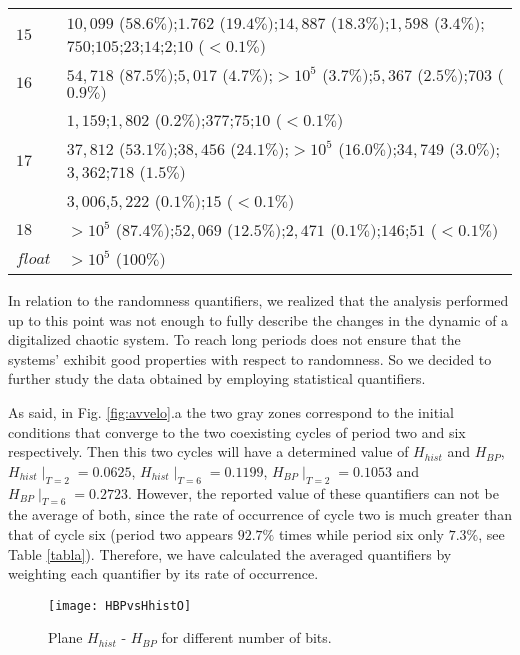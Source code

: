 \begin{table*}[!t]
\begin{tabular}{l  l  }
$15$ & $10,099$ {\scriptsize($58.6 \%)$};$1.762$ {\scriptsize($19.4 \%)$};$14,887$ {\scriptsize($18.3\%)$};$1,598$ {\scriptsize($3.4\%)$};$750$;$105$;$23$;$14$;$2$;$10$ {\scriptsize($<0.1\%)$}\\
$16$ & $54,718$ {\scriptsize($87.5\% )$};$5,017$ {\scriptsize($4.7\% )$};$>10^5$ {\scriptsize($3.7\% )$};$5,367$ {\scriptsize($2.5\% )$};$703$ {\scriptsize($0.9\% )$}\\
& $1,159$;$1,802$ {\scriptsize($0.2\% )$};$377$;$75$;$10$ {\scriptsize($<0.1\%  )$}\\  
$17$ & $37,812$ {\scriptsize($53.1\% )$};$38,456$ {\scriptsize($24.1\% )$};$>10^5$ {\scriptsize($16.0\%)$};$34,749$ {\scriptsize($3.0\% )$};$3,362$;$718$ {\scriptsize($1.5\%)$}\\
& $3,006$,$5,222$ {\scriptsize($0.1\% )$};$15$ {\scriptsize($<0.1 \%)$}\\  
$18$ & $>10^5$ {\scriptsize($87.4\%)$};$52,069$ {\scriptsize($12.5\% )$};$2,471$ {\scriptsize($0.1\% )$};$146$;$51$ {\scriptsize($<0.1 \%)$}\\
$float$ & $>10^5$ {\scriptsize($100\% )$}\\
\hline

\end{tabular}

\end{table*}


In relation to the randomness quantifiers, we realized that the analysis performed up to this point was not enough to fully describe the changes in the dynamic of a digitalized chaotic system.
To reach long periods does not ensure that the systems' exhibit good properties with respect to randomness. So we decided to further study the data obtained by employing statistical quantifiers.

As said, in Fig. \ref{fig:avvelo}.a the two gray zones correspond to the initial conditions that converge to the two coexisting cycles of period two and six respectively.
Then this two cycles will have a determined value of $H_{hist}$ and $H_{BP}$, $H_{hist}\mid_{T=2}=0.0625$, $H_{hist}\mid_{T=6}=0.1199$, $H_{BP}\mid_{T=2}=0.1053$ and $H_{BP}\mid_{T=6}=0.2723$.
However, the reported value of these quantifiers can not be the average of both, since the rate of occurrence of cycle two is much greater than that of cycle six (period two appears $92.7\%$ times while period six only $7.3\%$, see Table \ref{tabla}).
Therefore, we have calculated the averaged quantifiers by weighting each quantifier by its rate of occurrence.
%
\begin{figure}
    \centering
        \texttt{[image: HBPvsHhistO]}\\
    \caption{Plane $H_{hist}$ - $H_{BP}$  for different number of bits. }\label{fig:HBPvsHhist}
\end{figure}



